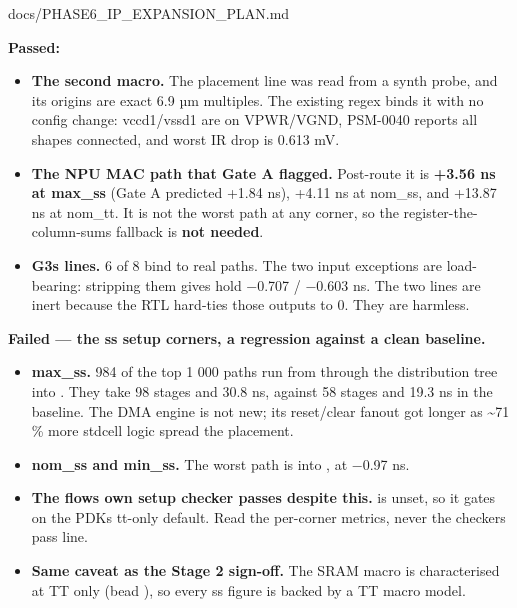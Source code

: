 \begin{relocated}{docs/PHASE6_IP_EXPANSION_PLAN.md}
{}

\textbf{Passed:}

\begin{itemize}
\tightlist
\item
  \textbf{The second macro.} The placement line was read from a synth
  probe, and its origins are exact 6.9 µm multiples. The existing
   regex binds it with no config change:
  vccd1/\allowbreak{}vssd1 are on VPWR/\allowbreak{}VGND, PSM-0040
  reports all shapes connected, and worst IR drop is 0.613 mV.
\item
  \textbf{The NPU MAC path that Gate A flagged.} Post-route it is
  \textbf{+3.56 ns at max\_ss} (Gate A predicted +1.84 ns), +4.11 ns at
  nom\_ss, and +13.87 ns at nom\_tt. It is not the worst path at any
  corner, so the register-the-column-sums fallback is \textbf{not
  needed}.
\item
  \textbf{G3\textquotesingle s  lines.} 6 of 8 bind
  to real paths. The two  input exceptions are
  load-bearing: stripping them gives hold −0.707 / −0.603 ns. The two
   lines are inert because the RTL hard-ties those outputs
  to 0. They are harmless.
\end{itemize}

\textbf{Failed --- the ss setup corners, a regression against a clean
baseline.}

\begin{itemize}
\tightlist
\item
  \textbf{max\_ss.} 984 of the top 1 000 paths run from
   through the  distribution tree
  into . They take 98 stages and 30.8 ns, against 58
  stages and 19.3 ns in the baseline. The DMA engine is not new; its
  reset/\allowbreak{}clear fanout got longer as \textasciitilde71 \%
  more stdcell logic spread the placement.
\item
  \textbf{nom\_ss and min\_ss.} The worst path is  into
  , at −0.97 ns.
\item
  \warn{} \textbf{The flow\textquotesingle s own setup checker passes
  despite this.}  is unset, so it gates on
  the PDK\textquotesingle s tt-only default. Read the per-corner
  metrics, never the checker\textquotesingle s pass line.
\item
  \warn{} \textbf{Same caveat as the Stage 2 sign-off.} The SRAM macro
  is characterised at TT only (bead ), so every ss figure is
  backed by a TT macro model.
\end{itemize}


\end{relocated}
